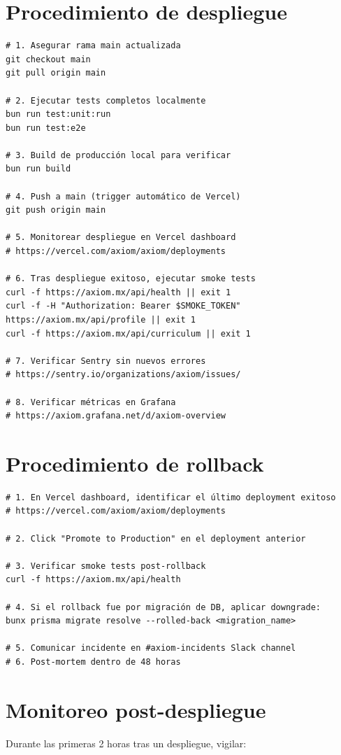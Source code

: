 \section{Procedimiento de despliegue}

\begin{lstlisting}[style=bash,caption={Procedimiento de despliegue a producción}]
# 1. Asegurar rama main actualizada
git checkout main
git pull origin main

# 2. Ejecutar tests completos localmente
bun run test:unit:run
bun run test:e2e

# 3. Build de producción local para verificar
bun run build

# 4. Push a main (trigger automático de Vercel)
git push origin main

# 5. Monitorear despliegue en Vercel dashboard
# https://vercel.com/axiom/axiom/deployments

# 6. Tras despliegue exitoso, ejecutar smoke tests
curl -f https://axiom.mx/api/health || exit 1
curl -f -H "Authorization: Bearer $SMOKE_TOKEN" https://axiom.mx/api/profile || exit 1
curl -f https://axiom.mx/api/curriculum || exit 1

# 7. Verificar Sentry sin nuevos errores
# https://sentry.io/organizations/axiom/issues/

# 8. Verificar métricas en Grafana
# https://axiom.grafana.net/d/axiom-overview
\end{lstlisting}

\section{Procedimiento de rollback}

\begin{lstlisting}[style=bash,caption={Rollback de emergencia}]
# 1. En Vercel dashboard, identificar el último deployment exitoso
# https://vercel.com/axiom/axiom/deployments

# 2. Click "Promote to Production" en el deployment anterior

# 3. Verificar smoke tests post-rollback
curl -f https://axiom.mx/api/health

# 4. Si el rollback fue por migración de DB, aplicar downgrade:
bunx prisma migrate resolve --rolled-back <migration_name>

# 5. Comunicar incidente en #axiom-incidents Slack channel
# 6. Post-mortem dentro de 48 horas
\end{lstlisting}

\section{Monitoreo post-despliegue}
Durante las primeras 2 horas tras un despliegue, vigilar:

